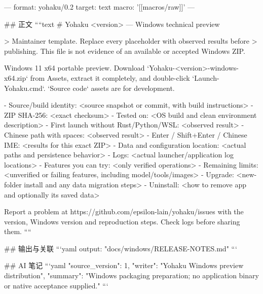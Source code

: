 ---
format: yohaku/0.2
target: text
macro: '[[macros/raw]]'
---

## 正文
````text
# Yohaku <version> — Windows technical preview

> Maintainer template. Replace every placeholder with observed results before
> publishing. This file is not evidence of an available or accepted Windows ZIP.

Windows 11 x64 portable preview. Download `Yohaku-<version>-windows-x64.zip`
from Assets, extract it completely, and double-click `Launch-Yohaku.cmd`.
`Source code` assets are for development.

- Source/build identity: <source snapshot or commit, with build instructions>
- ZIP SHA-256: <exact checksum>
- Tested on: <OS build and clean environment description>
- First launch without Rust/Python/WSL: <observed result>
- Chinese path with spaces: <observed result>
- Enter / Shift+Enter / Chinese IME: <results for this exact ZIP>
- Data and configuration location: <actual paths and persistence behavior>
- Logs: <actual launcher/application log locations>
- Features you can try: <only verified operations>
- Remaining limits: <unverified or failing features, including model/tools/images>
- Upgrade: <new-folder install and any data migration steps>
- Uninstall: <how to remove app and optionally its saved data>

Report a problem at https://github.com/epsilon-lain/yohaku/issues with the
version, Windows version and reproduction steps. Check logs before sharing them.
````

## 输出与关联
```yaml
output: "docs/windows/RELEASE-NOTES.md"
```

## AI 笔记
```yaml
{"source_version": 1, "writer": "Yohaku Windows preview distribution", "summary": "Windows packaging preparation; no application binary or native acceptance supplied."}
```
